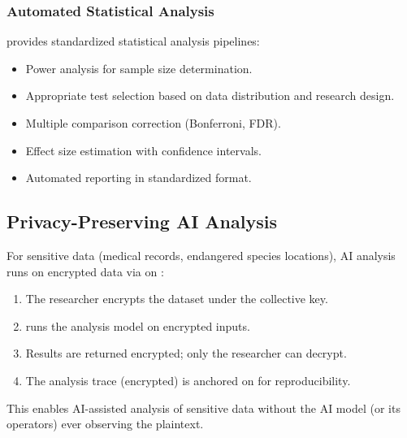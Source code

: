 \subsubsection{Automated Statistical Analysis}

\AChain{} provides standardized statistical analysis pipelines:

\begin{itemize}
    \item Power analysis for sample size determination.
    \item Appropriate test selection based on data distribution and research design.
    \item Multiple comparison correction (Bonferroni, FDR).
    \item Effect size estimation with confidence intervals.
    \item Automated reporting in standardized format.
\end{itemize}

\subsection{Privacy-Preserving AI Analysis}

For sensitive data (medical records, endangered species locations), AI analysis runs on encrypted data via \CKKS{} on \AChain{} \cite{zoo-fhe}:

\begin{enumerate}
    \item The researcher encrypts the dataset under the collective \FHE{} key.
    \item \AChain{} runs the analysis model on encrypted inputs.
    \item Results are returned encrypted; only the researcher can decrypt.
    \item The analysis trace (encrypted) is anchored on \IChain{} for reproducibility.
\end{enumerate}

This enables AI-assisted analysis of sensitive data without the AI model (or its operators) ever observing the plaintext.

